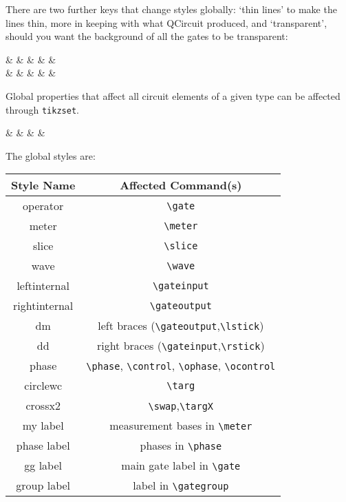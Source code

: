 \documentclass[aps,pra,10pt,nofootinbib]{revtex4-2}
\begin{document}
There are two further keys that change styles globally: `thin lines' to make the lines thin, more in keeping with what QCircuit produced, and `transparent', should you want the background of all the gates to be transparent:
\begin{Code}
\begin{quantikz}
&  & &  & & \\
& \targ{} &  & \targ{} &  & \meter{}
\end{quantikz}
\end{Code}

Global properties that affect all circuit elements of a given type can be affected through \verb!tikzset!.
\begin{Code}
\begin{quantikz}
&  & \phase{\beta} &  & \meter{\ket{\pm}}
\end{quantikz}
\end{Code}
The global styles are:
\begin{center}
\begin{tabular}{c|c}
Style Name & Affected Command(s)  \\
\hline
operator & \verb!\gate!  \\
meter & \verb!\meter! \\
slice & \verb!\slice! \\
wave & \verb!\wave! \\
leftinternal & \verb!\gateinput! \\
rightinternal   & \verb!\gateoutput! \\
dm & left braces (\verb!\gateoutput!,\verb!\lstick!) \\
dd & right braces (\verb!\gateinput!,\verb!\rstick!) \\
phase & \verb!\phase!, \verb!\control!, \verb!\ophase!, \verb!\ocontrol! \\
circlewc & \verb!\targ! \\
crossx2 & \verb!\swap!,\verb!\targX! \\
my label & measurement bases in \verb!\meter! \\
phase label & phases in \verb!\phase! \\
gg label & main gate label in \verb!\gate! \\
group label & label in \verb!\gategroup!
\end{tabular}
\end{center}
\end{document}
